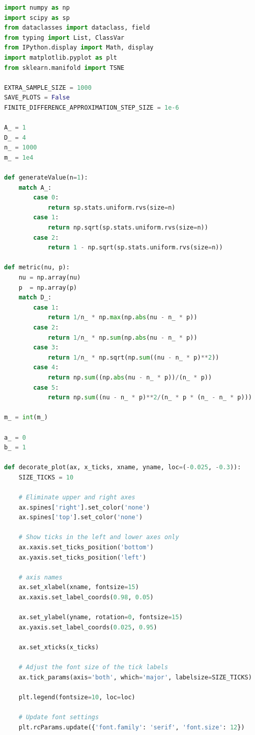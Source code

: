 \documentclass[a4paper, 14pt]{extarticle}
\begin{document}
\begin{center}
  \begin{lstlisting}[language=Python]
import numpy as np
import scipy as sp
from dataclasses import dataclass, field
from typing import List, ClassVar
from IPython.display import Math, display
import matplotlib.pyplot as plt
from sklearn.manifold import TSNE

EXTRA_SAMPLE_SIZE = 1000
SAVE_PLOTS = False
FINITE_DIFFERENCE_APPROXIMATION_STEP_SIZE = 1e-6

A_ = 1
D_ = 4
n_ = 1000
m_ = 1e4

def generateValue(n=1):
    match A_:
        case 0:
            return sp.stats.uniform.rvs(size=n)
        case 1:
            return np.sqrt(sp.stats.uniform.rvs(size=n))
        case 2:
            return 1 - np.sqrt(sp.stats.uniform.rvs(size=n))

def metric(nu, p):
    nu = np.array(nu)
    p  = np.array(p)
    match D_:
        case 1:
            return 1/n_ * np.max(np.abs(nu - n_ * p))
        case 2:
            return 1/n_ * np.sum(np.abs(nu - n_ * p))
        case 3:
            return 1/n_ * np.sqrt(np.sum((nu - n_ * p)**2))
        case 4:
            return np.sum((np.abs(nu - n_ * p))/(n_ * p))
        case 5:
            return np.sum((nu - n_ * p)**2/(n_ * p * (n_ - n_ * p)))

m_ = int(m_)

a_ = 0
b_ = 1

def decorate_plot(ax, x_ticks, xname, yname, loc=(-0.025, -0.3)):
    SIZE_TICKS = 10

    # Eliminate upper and right axes
    ax.spines['right'].set_color('none')
    ax.spines['top'].set_color('none')

    # Show ticks in the left and lower axes only
    ax.xaxis.set_ticks_position('bottom')
    ax.yaxis.set_ticks_position('left')

    # axis names
    ax.set_xlabel(xname, fontsize=15)
    ax.xaxis.set_label_coords(0.98, 0.05)

    ax.set_ylabel(yname, rotation=0, fontsize=15)
    ax.yaxis.set_label_coords(0.025, 0.95)

    ax.set_xticks(x_ticks)

    # Adjust the font size of the tick labels
    ax.tick_params(axis='both', which='major', labelsize=SIZE_TICKS)

    plt.legend(fontsize=10, loc=loc)

    # Update font settings
    plt.rcParams.update({'font.family': 'serif', 'font.size': 12})


\end{lstlisting}
\end{center}
\end{document}
